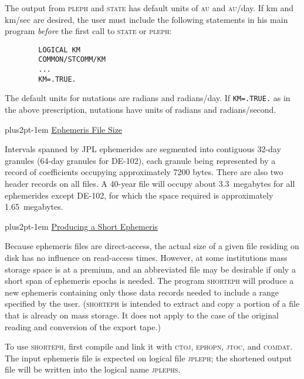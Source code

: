 \documentclass[twoside,11pt]{article}
\renewcommand{\_}{\texttt{\symbol{95}}}
\newcommand{\hdg}[1]{\vskip4pt plus2pt\leavevmode\kern-1em \underline{\large{#1}}\par}
\newcommand{\hdg}[1]{\subsection*{{#1}}}
\begin{document}
The output from \textsc{pleph} and \textsc{state}
has default units of \textsc{au} and \textsc{au}/day. If km and km/sec
are desired, the user must include the following statements
in his main program \textit{before\/} the first call to \textsc{state}
or \textsc{pleph}:

%

\begin{verbatim}
        LOGICAL KM
        COMMON/STCOMM/KM
        ...
        KM=.TRUE.
\end{verbatim}

The default units for nutations are radians and radians/day. If
\texttt{KM=.TRUE.} as in the above prescription, nutations have units
of radians and radians/second.

\newpage                                             %

\hdg{Ephemeris File Size}

Intervals spanned by JPL ephemerides are segmented into contiguous
32-day granules (64-day granules for DE-102),
each granule being represented by a
record of coefficients occupying approximately 7200 bytes.
There are also two
header records on all files. A 40-year file will occupy about
3.3~megabytes for all ephemerides except DE-102, for which the
space required is approximately 1.65~megabytes.

\hdg{Producing a Short Ephemeris}

Because ephemeris files are direct-access, the actual size of a given
file residing on disk has no influence on read-access times.
However, at some institutions mass storage space is at a premium, and
an abbreviated file may be desirable if only a short span of ephemeris
epochs is needed. The program \textsc{shorteph} will produce a new
ephemeris containing only those data records needed to include
a range specified by the user. (\textsc{shorteph} is intended to
extract and copy a portion of a file that is already on mass storage.
It does not apply to the case of the original reading and
conversion of the export tape.)

To use \textsc{shorteph}, first compile and link it with \textsc{ctoj,
 ephopn, jtoc}, and \textsc{comdat}. The input ephemeris
file is expected on logical file \textsc{jpleph}; the shortened output file
will be written into the logical name \textsc{jplephs}.
\end{document}
